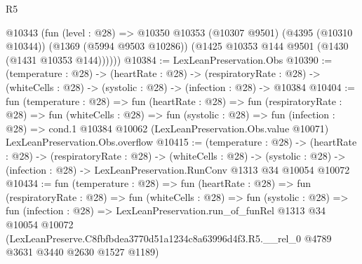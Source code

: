 \begin{lexlean}{R5}
\begin{coremodule}
      @10343
        (fun (level : @28) =>
        @10350
          @10353
          (@10307 @9501)
          (@4395 (@10310 @10344))
          (@1369 (@5994 @9503 @10286))
          (@1425 @10353 @144 @9501 (@1430 (@1431 @10353 @144))))))
@10384 := LexLeanPreservation.Obs
@10390 := (temperature : @28) ->
  (heartRate : @28) ->
  (respiratoryRate : @28) -> (whiteCells : @28) -> (systolic : @28) -> (infection : @28) -> @10384
@10404 := fun (temperature : @28) =>
  fun (heartRate : @28) =>
  fun (respiratoryRate : @28) =>
  fun (whiteCells : @28) =>
  fun (systolic : @28) =>
  fun (infection : @28) =>
  cond.{1} @10384 @10062 (LexLeanPreservation.Obs.value @10071) LexLeanPreservation.Obs.overflow
@10415 := (temperature : @28) ->
  (heartRate : @28) ->
  (respiratoryRate : @28) ->
  (whiteCells : @28) ->
  (systolic : @28) -> (infection : @28) -> LexLeanPreservation.RunConv @1313 @34 @10054 @10072
@10434 := fun (temperature : @28) =>
  fun (heartRate : @28) =>
  fun (respiratoryRate : @28) =>
  fun (whiteCells : @28) =>
  fun (systolic : @28) =>
  fun (infection : @28) =>
  LexLeanPreservation.run_of_funRel
    @1313
    @34
    @10054
    @10072
    (LexLeanPreserve.C8fbfbdea3770d51a1234c8a63996d4f3.R5.__rel_0
      @4789
      @3631
      @3440
      @2630
      @1527
      @1189)
\end{coremodule}
\end{lexlean}
